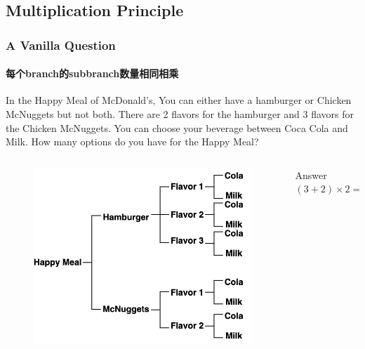 \documentclass[
	11pt, %
]{beamer}
\begin{document}

\subsection{Multiplication Principle}


\begin{frame}
	\frametitle{A Vanilla Question} %
	\framesubtitle{每个branch的subbranch数量相同相乘}
						In the Happy Meal of McDonald's, You can either have a hamburger or Chicken McNuggets but not both. There are 2 flavors for the hamburger and 3 flavors for the Chicken McNuggets. You can choose your beverage between Coca Cola and Milk. How many options do you have for the Happy Meal?\\
			\pause

	\begin{columns}[t] 
		\begin{column}{0.6\textwidth} %
		\pause
			\begin{figure}
				\includegraphics[width=0.8\linewidth]{Multiplication_Vanilla.png}
			\end{figure}
		\end{column}
		\begin{column}{0.3\textwidth} %

			\pause
			Answer \textbf{$(3 + 2)\times 2 = 10$}
		\end{column}
	\end{columns}

\end{frame}
\end{document}
